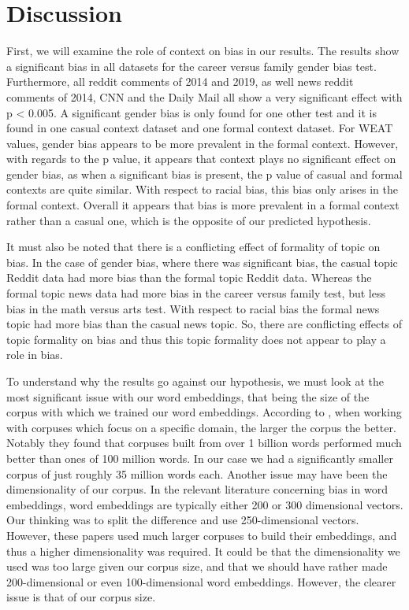 \documentclass[10pt,letterpaper]{article}
\begin{document}
\section{Discussion}

First, we will examine the role of context on bias in our results. The results show a significant bias in all datasets for the career versus family gender bias test. Furthermore, all reddit comments of 2014 and 2019, as well news reddit comments of 2014, CNN and the Daily Mail all show a very significant effect with p < 0.005. A significant gender bias is only found for one other test and it is found in one casual context dataset and one formal context dataset. For WEAT values, gender bias appears to be more prevalent in the formal context. However, with regards to the p value, it appears that context plays no significant effect on gender bias, as when a significant bias is present, the p value of casual and formal contexts are quite similar. With respect to racial bias, this bias only arises in the formal context. Overall it appears that bias is more prevalent in a formal context rather than a casual one, which is the opposite of our predicted hypothesis.

It must also be noted that there is a conflicting effect of formality of topic on bias. In the case of gender bias, where there was significant bias, the casual topic Reddit data had more bias than the formal topic Reddit data. Whereas the formal topic news data had more bias in the career versus family test, but less bias in the math versus arts test. With respect to racial bias the formal news topic had more bias than the casual news topic. So, there are conflicting effects of topic formality on bias and thus this topic formality does not appear to play a role in bias.

To understand why the results go against our hypothesis, we must look at the most significant issue with our word embeddings, that being the size of the corpus with which we trained our word embeddings. According to , when working with corpuses which focus on a specific domain, the larger the corpus the better. Notably they found that corpuses built from over 1 billion words performed much better than ones of 100 million words. In our case we had a significantly smaller corpus of just roughly 35 million words each. Another issue may have been the dimensionality of our corpus. In the relevant literature concerning bias in word embeddings, word embeddings are typically either 200 \cite{Kozlowski2019a} or 300 \cite{Caliskan2017a} dimensional vectors. Our thinking was to split the difference and use 250-dimensional vectors. However, these papers used much larger corpuses to build their embeddings, and thus a higher dimensionality was required. It could be that the dimensionality we used was too large given our corpus size, and that we should have rather made 200-dimensional or even 100-dimensional word embeddings. However, the clearer issue is that of our corpus size.
\end{document}
